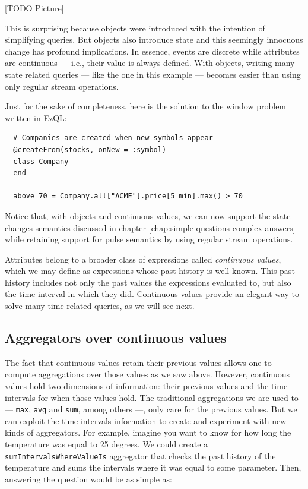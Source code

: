 \documentclass{report}
\begin{document}
[TODO Picture]

This is surprising because objects were introduced with the intention
of simplifying queries. But objects also introduce state and this
seemingly innocuous change has profound implications. In essence,
events are discrete while attributes are continuous --- i.e., their
value is always defined. With objects, writing many state related
queries --- like the one in this example --- becomes easier than using
only regular stream operations.

Just for the sake of completeness, here is the solution to the window
problem written in EzQL:

\begin{lstlisting}
  # Companies are created when new symbols appear
  @createFrom(stocks, onNew = :symbol)
  class Company
  end

  above_70 = Company.all["ACME"].price[5 min].max() > 70
\end{lstlisting}

Notice that, with objects and continuous values, we can now support
the state-changes semantics discussed in chapter
\ref{chap:simple-questions-complex-answers} while retaining support
for pulse semantics by using regular stream operations.

Attributes belong to a broader class of expressions called
\emph{continuous values}, which we may define as expressions whose
past history is well known. This past history includes not only the
past values the expressions evaluated to, but also the time interval
in which they did. Continuous values provide an elegant way to solve
many time related queries, as we will see next.

\subsection{Aggregators over continuous values}

The fact that continuous values retain their previous values allows
one to compute aggregations over those values as we saw
above. However, continuous values hold two dimensions of information:
their previous values and the time intervals for when those values
hold. The traditional aggregations we are used to --- \verb=max=,
\verb=avg= and \verb=sum=, among others ---, only care for the
previous values. But we can exploit the time intervals information to
create and experiment with new kinds of aggregators. For example,
imagine you want to know for how long the temperature was equal to 25
degrees. We could create a \verb=sumIntervalsWhereValueIs= aggregator
that checks the past history of the temperature and sums the intervals
where it was equal to some parameter. Then, answering the question
would be as simple as:
\end{document}
